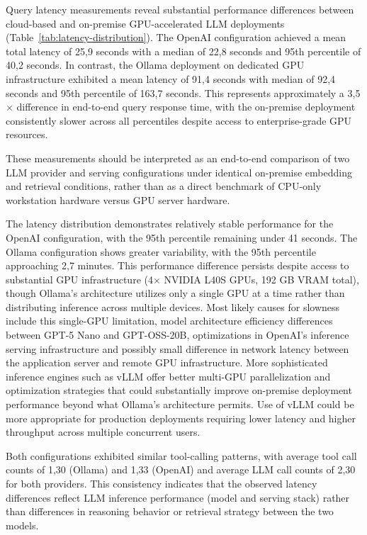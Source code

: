 Query latency measurements reveal substantial performance differences between cloud-based and on-premise GPU-accelerated LLM deployments (Table~\ref{tab:latency-distribution}). The OpenAI configuration achieved a mean total latency of 25,9 seconds with a median of 22,8 seconds and 95th percentile of 40,2 seconds. In contrast, the Ollama deployment on dedicated GPU infrastructure exhibited a mean latency of 91,4 seconds with median of 92,4 seconds and 95th percentile of 163,7 seconds. This represents approximately a 3,5$\times$ difference in end-to-end query response time, with the on-premise deployment consistently slower across all percentiles despite access to enterprise-grade GPU resources.

These measurements should be interpreted as an end-to-end comparison of two LLM provider and serving configurations under identical on-premise embedding and retrieval conditions, rather than as a direct benchmark of CPU-only workstation hardware versus GPU server hardware.

The latency distribution demonstrates relatively stable performance for the OpenAI configuration, with the 95th percentile remaining under 41 seconds. The Ollama configuration shows greater variability, with the 95th percentile approaching 2,7 minutes. This performance difference persists despite access to substantial GPU infrastructure (4$\times$ NVIDIA L40S GPUs, 192 GB VRAM total), though Ollama's architecture utilizes only a single GPU at a time rather than distributing inference across multiple devices. Most likely causes for slowness include this single-GPU limitation, model architecture efficiency differences between GPT-5 Nano and GPT-OSS-20B, optimizations in OpenAI's inference serving infrastructure and possibly small difference in network latency between the application server and remote GPU infrastructure. More sophisticated inference engines such as vLLM \parencite{umeshOllamaVsVLLM2025} offer better multi-GPU parallelization and optimization strategies that could substantially improve on-premise deployment performance beyond what Ollama's architecture permits. Use of vLLM could be more appropriate for production deployments requiring lower latency and higher throughput across multiple concurrent users. \parencite{umeshOllamaVsVLLM2025}

Both configurations exhibited similar tool-calling patterns, with average tool call counts of 1,30 (Ollama) and 1,33 (OpenAI) and average LLM call counts of 2,30 for both providers. This consistency indicates that the observed latency differences reflect LLM inference performance (model and serving stack) rather than differences in reasoning behavior or retrieval strategy between the two models.

